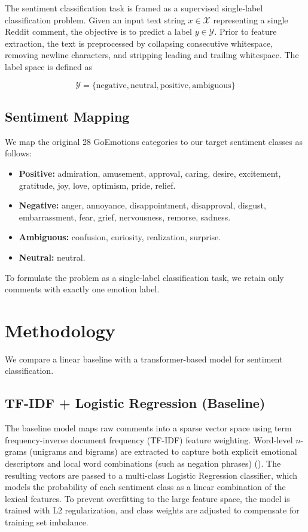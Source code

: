 \documentclass[
  conference,
  letterpaper]{IEEEtran}
\providecommand{\tightlist}{%
  \setlength{\itemsep}{0pt}\setlength{\parskip}{0pt}}
\begin{document}
The sentiment classification task is framed as a supervised single-label
classification problem. Given an input text string \(x \in \mathcal{X}\)
representing a single Reddit comment, the objective is to predict a
label \(y \in \mathcal{Y}\). Prior to feature extraction, the text is
preprocessed by collapsing consecutive whitespace, removing newline
characters, and stripping leading and trailing whitespace. The label
space is defined as

\[\mathcal{Y} = \{\text{negative}, \text{neutral}, \text{positive}, \text{ambiguous}\}\]

\subsection{Sentiment Mapping}\label{sentiment-mapping}

We map the original 28 GoEmotions categories to our target sentiment
classes as follows:

\begin{itemize}
\tightlist
\item
  \textbf{Positive:} admiration, amusement, approval, caring, desire,
  excitement, gratitude, joy, love, optimism, pride, relief.
\item
  \textbf{Negative:} anger, annoyance, disappointment, disapproval,
  disgust, embarrassment, fear, grief, nervousness, remorse, sadness.
\item
  \textbf{Ambiguous:} confusion, curiosity, realization, surprise.
\item
  \textbf{Neutral:} neutral.
\end{itemize}

To formulate the problem as a single-label classification task, we
retain only comments with exactly one emotion label.

\section{Methodology}\label{methodology}

We compare a linear baseline with a transformer-based model for
sentiment classification.

\subsection{TF-IDF + Logistic Regression
(Baseline)}\label{tf-idf-logistic-regression-baseline}

The baseline model maps raw comments into a sparse vector space using
term frequency-inverse document frequency (TF-IDF) feature weighting.
Word-level \(n\)-grams (unigrams and bigrams) are extracted to capture
both explicit emotional descriptors and local word combinations (such as
negation phrases) ().
The resulting vectors are passed to a multi-class Logistic Regression
classifier, which models the probability of each sentiment class as a
linear combination of the lexical features. To prevent overfitting to
the large feature space, the model is trained with L2 regularization,
and class weights are adjusted to compensate for training set imbalance.
\end{document}
